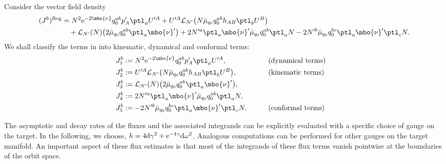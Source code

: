  Consider the vector field density
 \begin{align*}
 	(J^b)^{{\rm Reg}}&{}= N^2 {\rm e}^{-2 \mbo{\nu}} q^{ab}_0 p'_A \ptl_a U'^A + U'^A \mathcal{L}_{N'} \bigl(N \bar{\mu}_{q_0} q^{ab}_0 h_{AB} \ptl_b U^B\bigr) \notag\\
 	&\quad{}+ \mathcal{L}_{N'} (N) \bigl(2 \bar{\mu}_{q_0} q^{ab}_0 \ptl_a \mbo{\nu}'\bigr) + 2 N'^a \ptl_a \mbo{\nu}' \bar{\mu}_{q_0} q^{ab}_0 \ptl_a N
 - 2 N'^b \bar{\mu}_{q_0} q^{bc}_0 \ptl_a \mbo{\nu}' \ptl_c N.
 	\end{align*}
 We shall classify the terms in  into kinematic, dynamical and conformal terms:
 \begin{alignat*}{3}
 	&J_1^b := N^2 {\rm e}^{-2 \mbo{\nu}} q^{ab}_0 p'_A \ptl_a U'^A, \qquad && \text{(dynamical terms)}& \\
 	&J_2^b := U'^A \mathcal{L}_{N'} \bigl(N \bar{\mu}_{q_0} q^{ab}_0 h_{AB} \ptl_b U^B\bigr), \qquad && \text{(kinematic terms)}& \\
 	&J_3^b := \mathcal{L}_{N'} (N) \bigl(2 \bar{\mu}_{q_0} q^{ab}_0 \ptl_a \mbo{\nu}'\bigr), &&& \\
 	&J_4^b := 2 N'^a \ptl_a \mbo{\nu}' \bar{\mu}_{q_0} q^{ab}_0 \ptl_a N, &&&\\
 	&J_5^b := - 2 N'^b \bar{\mu}_{q_0} q^{bc}_0 \ptl_a \mbo{\nu}' \ptl_c N. \qquad && \text{(conformal terms)}
 	\end{alignat*}

The asymptotic and decay rates of the fluxes and the associated integrands can be explicitly evaluated with a specific choice of gauge on the target. In the following, we choose, $h = 4 {\rm d}\gamma ^2 + {\rm e}^{-4 \gamma } {\rm d} \omega^2$. Analogous computations can be performed for other gauges on the target manifold. An important aspect of these flux estimates is that most of the integrands of these flux terms vanish pointwise at the boundaries of the orbit space. %

